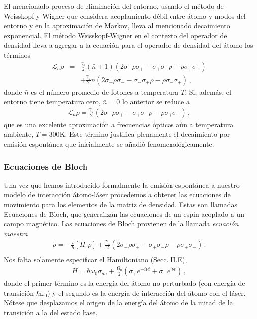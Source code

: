 \documentclass[12pt]{report}
\begin{document}
El mencionado proceso de eliminaci\'on del entorno, usando el m\'etodo 
de Weisskopf y Wigner que considera acoplamiento d\'ebil entre \'atomo 
y modos del entorno y en la aproximaci\'on de Markov, lleva al mencionado 
decaimiento exponencial. El m\'etodo Weisskopf-Wigner en el contexto 
del operador de densidad lleva a agregar a la ecuaci\'on para el operador 
de densidad del \'atomo los t\'erminos 
%
\begin{eqnarray} 	\label{eq:mEq2LA_bb}
\mathcal{L}_a \rho &=& \frac{\gamma_a}{2} (\bar{n} +1) 
	\left( 2 \sigma_- \rho \sigma_+ -\sigma_+ \sigma_- \rho 
	-\rho \sigma_+ \sigma_- \right) 	\nonumber \\
	&& + \frac{\gamma_a}{2} \bar{n}  
	\left( 2 \sigma_+ \rho \sigma_- -\sigma_- \sigma_+ \rho 
	-\rho \sigma_- \sigma_+ \right)\,, 
\end{eqnarray}
donde $\bar{n}$ es el n\'umero promedio de fotones a temperatura 
$T$. Si, adem\'as, el entorno tiene temperatura cero, $\bar{n} =0$ lo 
anterior se reduce a 
%
\begin{eqnarray}
\mathcal{L}_a \rho = \frac{\gamma_a}{2} \left( 2 \sigma_- \rho \sigma_+ 
	-\sigma_+ \sigma_- \rho -\rho \sigma_+ \sigma_- \right) \,, 
\end{eqnarray}
que es una excelente aproximaci\'on a frecuencias \'opticas a\'un a 
temperatura ambiente, $T = 300$K. Este t\'ermino justifica plenamente 
el decaimiento por emisi\'on espont\'anea que inicialmente se a\~nadi\'o 
fenomenol\'ogicamente. 

\subsubsection{Ecuaciones de Bloch} 
Una vez que hemos introducido formalmente la emisi\'on espont\'anea a 
nuestro modelo de interacci\'on \'atomo-l\'aser procedemos a obtener las 
ecuaciones de movimiento para los elementos de la matriz de densidad. 
Estas son llamadas Ecuaciones de Bloch, que generalizan las ecuaciones 
de un esp\'in acoplado a un campo magn\'etico. Las ecuaciones de Bloch 
provienen de la llamada \textit{ecuaci\'on maestra} 
%
\begin{eqnarray}
\dot{\rho} = -\frac{i}{\hbar} [H,\rho]  +\frac{\gamma_a}{2} 
	\left( 2 \sigma_- \rho \sigma_+ -\sigma_+ \sigma_- \rho 
	-\rho \sigma_+ \sigma_- \right) \,. 	\nonumber \\
\end{eqnarray}
Nos falta solamente especificar el Hamiltoniano (Secc. II.E), 
%
\begin{eqnarray}
 H = \hbar \omega_0 \sigma_{aa} + \frac{\Omega_0}{2} 
	(\sigma_+ e^{-i\nu t} 	+\sigma_- e^{i\nu t}) \,,
\end{eqnarray}
donde el primer t\'ermino es la energ\'ia del \'atomo no perturbado (con 
energ\'ia de transici\'on $\hbar \omega_0$) y el segundo es la energ\'ia de 
interacci\'on del \'atomo con el l\'aser. N\'otese que desplazamos el origen 
de la energ\'ia del \'atomo de la mitad de la transici\'on a la del estado base.  
\end{document}
